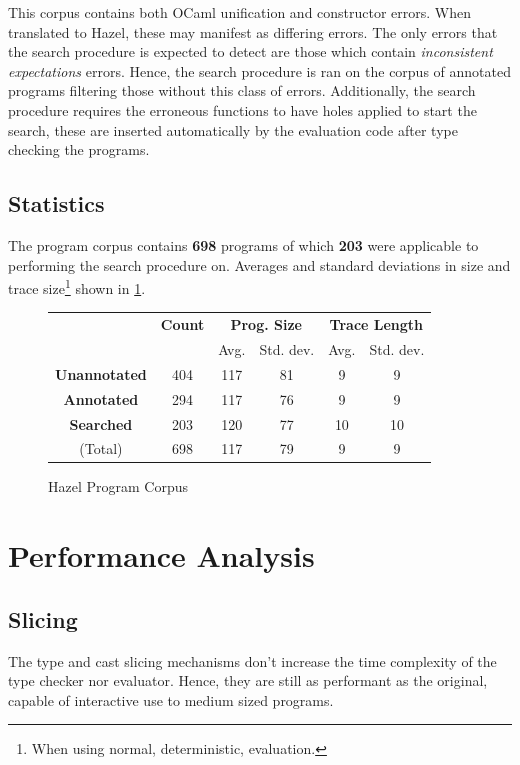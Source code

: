 This corpus contains both OCaml unification and constructor errors. When translated to Hazel, these may manifest as differing errors. The only errors that the search procedure is expected to detect are those which contain \textit{inconsistent expectations} errors. Hence, the search procedure is ran on the corpus of annotated programs filtering those without this class of errors. Additionally, the search procedure requires the erroneous functions to have holes applied to start the search, these are inserted automatically by the evaluation code after type checking the programs.


\subsection{Statistics}
The program corpus contains \textbf{698} programs of which \textbf{203} were applicable to performing the search procedure on. Averages and standard deviations in size and trace size\footnote{When using normal, deterministic, evaluation.} shown in \cref{fig:CorpusStats}.
\begin{figure}
\centering
\begin{tabular}{c|ccccc}
& \textbf{Count} & \multicolumn{2}{c}{\textbf{Prog. Size}}& \multicolumn{2}{c}{\textbf{Trace Length}}\\
&  & Avg. & Std. dev. & Avg. & Std. dev.\\
\hline
\textbf{Unannotated} &404 &117 &81 &9&9\\
\textbf{Annotated} &294 &117 &76 &9&9\\
\textbf{Searched} &203 &120 &77 &10 &10\\
\hline
(Total)  &698 &117 &79 &9 &9\\
\end{tabular}
\caption{Hazel Program Corpus}
\label{fig:CorpusStats}
\end{figure}

\section{Performance Analysis}\label{sec:PerformanceAnalysis}

\subsection{Slicing}
The type and cast slicing mechanisms don't increase the time complexity of the type checker nor evaluator. Hence, they are still as performant as the original, capable of interactive use to medium sized programs.

